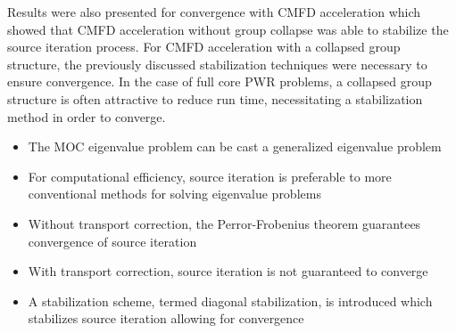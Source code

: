 Results were also presented for convergence with \ac{CMFD} acceleration which showed that \ac{CMFD} acceleration without group collapse was able to stabilize the source iteration process. For \ac{CMFD} acceleration with a collapsed group structure, the previously discussed stabilization techniques were necessary to ensure convergence. In the case of full core \ac{PWR} problems, a collapsed group structure is often attractive to reduce run time, necessitating a stabilization method in order to converge.


\vfill
\begin{highlightsbox}[frametitle=Highlights]
	\begin{itemize}
		
		\item The \ac{MOC} eigenvalue problem can be cast a generalized eigenvalue problem
		
		\item For computational efficiency, source iteration is preferable to more conventional methods for solving eigenvalue problems
		
		\item Without transport correction, the Perror-Frobenius theorem guarantees convergence of source iteration
		
		\item With transport correction, source iteration is not guaranteed to converge
		
		\item A stabilization scheme, termed diagonal stabilization, is introduced which stabilizes source iteration allowing for convergence
		
		
	\end{itemize}
\end{highlightsbox}
\vfill